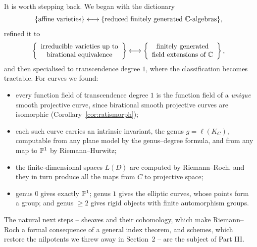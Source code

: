 \documentclass[a4paper]{scrartcl}
\begin{document}
It is worth stepping back. We began with the dictionary
$$\{\text{affine varieties}\} \longleftrightarrow \{\text{reduced finitely generated } \mathbb{C}\text{-algebras}\},$$
refined it to
$$\left\{\begin{array}{c}\text{irreducible varieties up to}\\ \text{birational equivalence}\end{array}\right\} \longleftrightarrow \left\{\begin{array}{c}\text{finitely generated}\\ \text{field extensions of } \mathbb{C}\end{array}\right\},$$
and then specialised to transcendence degree $1$, where the classification becomes tractable. For curves we found:
\begin{itemize}
	\item every function field of transcendence degree $1$ is the function field of a \emph{unique} smooth projective curve, since birational smooth projective curves are isomorphic (Corollary~\ref{cor:ratismorph});
	\item each such curve carries an intrinsic invariant, the genus $g = \ell(K_C)$, computable from any plane model by the genus--degree formula, and from any map to $\mathbb{P}^1$ by Riemann--Hurwitz;
	\item the finite-dimensional spaces $L(D)$ are computed by Riemann--Roch, and they in turn produce all the maps from $C$ to projective space;
	\item genus $0$ gives exactly $\mathbb{P}^1$; genus $1$ gives the elliptic curves, whose points form a group; and genus $\geq 2$ gives rigid objects with finite automorphism groups.
\end{itemize}
The natural next steps -- sheaves and their cohomology, which make Riemann--Roch a formal consequence of a general index theorem, and schemes, which restore the nilpotents we threw away in Section~2 -- are the subject of Part III.

\end{document}
